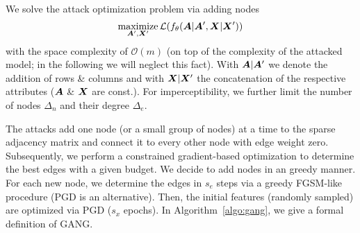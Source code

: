 \documentclass[letterpaper]{article} %
\newcommand{\adj}{\mA}
\newcommand{\features}{\mX}
\DeclareMathOperator*{\maximize}{maximize}
\begin{document}
We solve the attack optimization problem via adding nodes
\begin{equation}\label{eq:gang}
    \maximize_{\adj^\prime, \features^\prime} \mathcal{L}(f_{\theta}(\adj | \adj^\prime, \features | \features^\prime))
\end{equation}
with the space complexity of \(\mathcal{O}(m)\) (on top of the complexity of the attacked model; in the following we will neglect this fact). With \(\adj | \adj^\prime\) we denote the addition of rows \& columns and with \(\features | \features^\prime\) the concatenation of the respective attributes (\(\adj\) \& \(\features\) are const.). For imperceptibility, we further limit the number of nodes \(\Delta_n\) and their degree \(\Delta_e\).

The attacks add one node (or a small group of nodes) at a time to the sparse adjacency matrix and connect it to every other node with edge weight zero. Subsequently, we perform a constrained gradient-based optimization to determine the best edges with a given budget. We decide to add nodes in an greedy manner. For each new node, we determine the edges in \(s_e\) steps via a greedy FGSM-like procedure (PGD is an alternative). Then, the initial features (randomly sampled) are optimized via PGD (\(s_x\) epochs). In Algorithm~\ref{algo:gang}, we give a formal definition of GANG.
\end{document}
